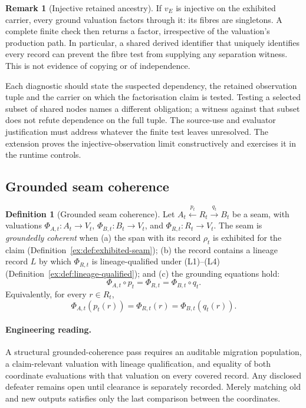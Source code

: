 \documentclass[11pt]{article}
\theoremstyle{definition}
\newtheorem{definition}{Definition}[section]
\newtheorem{remark}{Remark}[section]
\begin{document}
\begin{remark}[Injective retained ancestry]\label{ex:rem:injective-ancestry}
If $v_E$ is injective on the exhibited carrier, every ground valuation factors through it: its fibres are singletons. A complete finite check then returns a factor, irrespective of the valuation's production path. In particular, a shared derived identifier that uniquely identifies every record can prevent the fibre test from supplying any separation witness. This is not evidence of copying or of independence.

Each diagnostic should state the suspected dependency, the retained observation tuple and the carrier on which the factorisation claim is tested. Testing a selected subset of shared nodes names a different obligation; a witness against that subset does not refute dependence on the full tuple. The source-use and evaluator justification must address whatever the finite test leaves unresolved. The extension proves the injective-observation limit constructively and exercises it in the runtime controls.
\end{remark}

\subsection{Grounded seam coherence}\label{ex:sec:grounded-coherence}

\begin{definition}[Grounded seam coherence]\label{ex:def:grounded-seam}
Let $A_t \xleftarrow{p_t} R_t
\xrightarrow{q_t} B_t$ be a seam, with valuations
$\Phi_{A,t}:A_t\to V_t$, $\Phi_{B,t}:B_t\to V_t$, and
$\Phi_{R,t}:R_t\to V_t$. The seam is \emph{groundedly coherent} when (a) the span with its record $\rho_t$ is exhibited for the claim (Definition~\ref{ex:def:exhibited-seam}); (b) the record contains a lineage record $L$ by which $\Phi_{R,t}$ is lineage-qualified under (L1)--(L4) (Definition~\ref{ex:def:lineage-qualified}); and (c) the grounding equations hold:
\[
\Phi_{A,t}\circ p_t
=\Phi_{R,t}
=\Phi_{B,t}\circ q_t.
\]
Equivalently, for every $r\in R_t$,
\[
\Phi_{A,t}(p_t(r))
=\Phi_{R,t}(r)
=\Phi_{B,t}(q_t(r)).
\]
\end{definition}

\paragraph{Engineering reading.} A structural grounded-coherence pass requires an auditable migration population, a claim-relevant valuation with lineage qualification, and equality of both coordinate evaluations with that valuation on every covered record. Any disclosed defeater remains open until clearance is separately recorded. Merely matching old and new outputs satisfies only the last comparison between the coordinates.
\end{document}
